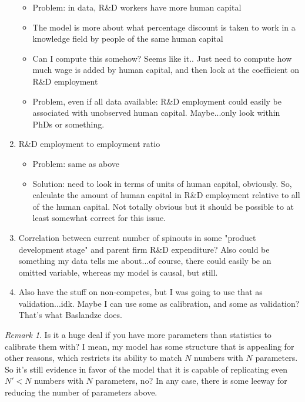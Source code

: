 \documentclass[12pt,english]{article}
\theoremstyle{remark}
\newtheorem{remark}{Remark}
\begin{document}
\begin{enumerate}
\begin{itemize}
		\item Problem: in data, R\&D workers have more human capital
		\item The model is more about what percentage discount is taken to work in a knowledge field by people of the same human capital
		\item Can I compute this somehow? Seems like it.. Just need to compute how much wage is added by human capital, and then look at the coefficient on R\&D employment
		\item Problem, even if all data available: R\&D employment could easily be associated with unobserved human capital. Maybe...only look within PhDs or something. 
	\end{itemize}
	\item R\&D employment to employment ratio
	\begin{itemize}
		\item Problem: same as above
		\item Solution: need to look in terms of units of human capital, obviously. So, calculate the amount of human capital in R\&D employment relative to all of the human capital. Not totally obvious but it should be possible to at least somewhat correct for this issue. 
	\end{itemize}
	\item Correlation between current number of spinouts in some "product development stage" and parent firm R\&D expenditure? Also could be something my data tells me about...of course, there could easily be an omitted variable, whereas my model is causal, but still. 
	\item Also have the stuff on non-competes, but I was going to use that as validation...idk. Maybe I can use some as calibration, and some as validation? That's what Baslandze does. 
\end{enumerate}

\begin{remark}
	Is it a huge deal if you have more parameters than statistics to calibrate them with? I mean, my model has some structure that is appealing for other reasons, which restricts its ability to match $N$ numbers with $N$ parameters. So it's still evidence in favor of the model that it is capable of replicating even $N'<N$ numbers with $N$ parameters, no? In any case, there is some leeway for reducing the number of parameters above. 
\end{remark}
\end{document}
